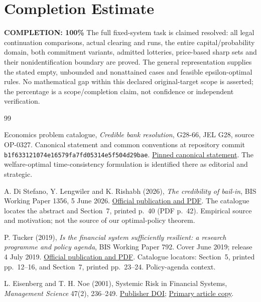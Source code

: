 \documentclass[11pt,a4paper]{article}
\numberwithin{equation}{section}
\theoremstyle{definition}
\begin{document}
\section{Completion Estimate}
\noindent\textbf{COMPLETION: 100\%}
The full fixed-system task is claimed resolved: all legal continuation
comparisons, actual clearing and runs, the entire capital/probability
domain, both commitment variants, admitted lotteries, price-based sharp
sets and their nonidentification boundary are proved. The general
representation supplies the stated empty, unbounded and nonattained
cases and feasible epsilon-optimal rules. No mathematical gap within
this declared original-target scope is asserted; the percentage is a
scope/completion claim, not confidence or independent verification.

\begin{thebibliography}{99}
\raggedright
{}
Economics problem catalogue, \emph{Credible bank resolution},
G28-66, JEL G28, source OP-0327. Canonical statement and common
conventions at repository commit
\texttt{b1f633121074e16579fa7fd05314e5f504d29bae}.
\href{https://github.com/mehmetmars7/Erdosproblems-llm-hunter/blob/b1f633121074e16579fa7fd05314e5f504d29bae/attacks/open_problems/economics/statements/G28-66.tex}{Pinned canonical statement}.
The welfare-optimal time-consistency formulation is identified there
as editorial and strategic.

A. Di Stefano, Y. Lengwiler and K. Rishabh (2026),
\emph{The credibility of bail-in}, BIS Working Paper 1356,
5 June 2026.
\href{https://www.bis.org/publications/working-paper-1356-credibility-bail-in}{Official publication and PDF}.
The catalogue locates the abstract and Section~7, printed p.~40
(PDF p.~42). Empirical source and motivation; not the source of our
optimal-policy theorem.

P. Tucker (2019), \emph{Is the financial system sufficiently resilient:
a research programme and policy agenda}, BIS Working Paper 792.
Cover June 2019; release 4 July 2019.
\href{https://www.bis.org/publications/working-paper-792-financial-system-sufficiently-resilient-research-programme-and-policy-agenda}{Official publication and PDF}.
Catalogue locators: Section~5, printed pp.~12--16, and Section~7,
printed pp.~23--24. Policy-agenda context.

L. Eisenberg and T. H. Noe (2001),
Systemic Risk in Financial Systems,
\emph{Management Science} 47(2), 236--249.
\href{https://doi.org/10.1287/mnsc.47.2.236.9835}{Publisher DOI};
\href{https://ms.mcmaster.ca/tom/Research\%20Papers/EiseNoe01.pdf}{Primary article copy}.


\end{thebibliography}
\end{document}
